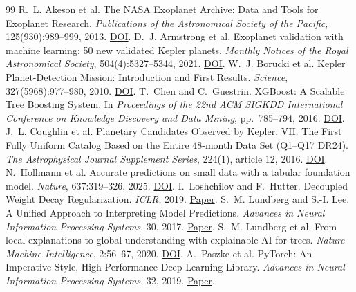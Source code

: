 \documentclass[11pt,a4paper]{article}
\begin{document}
\begin{thebibliography}{99}\small
{} R.~L. Akeson et al. The NASA Exoplanet Archive: Data and Tools for Exoplanet Research. \emph{Publications of the Astronomical Society of the Pacific}, 125(930):989--999, 2013. \href{https://doi.org/10.1086/672273}{DOI}.
 D.~J. Armstrong et al. Exoplanet validation with machine learning: 50 new validated Kepler planets. \emph{Monthly Notices of the Royal Astronomical Society}, 504(4):5327--5344, 2021. \href{https://doi.org/10.1093/mnras/staa2498}{DOI}.
 W.~J. Borucki et al. Kepler Planet-Detection Mission: Introduction and First Results. \emph{Science}, 327(5968):977--980, 2010. \href{https://doi.org/10.1126/science.1185402}{DOI}.
 T.~Chen and C.~Guestrin. XGBoost: A Scalable Tree Boosting System. In \emph{Proceedings of the 22nd ACM SIGKDD International Conference on Knowledge Discovery and Data Mining}, pp.~785--794, 2016. \href{https://doi.org/10.1145/2939672.2939785}{DOI}.
 J.~L. Coughlin et al. Planetary Candidates Observed by Kepler. VII. The First Fully Uniform Catalog Based on the Entire 48-month Data Set (Q1--Q17 DR24). \emph{The Astrophysical Journal Supplement Series}, 224(1), article 12, 2016. \href{https://doi.org/10.3847/0067-0049/224/1/12}{DOI}.
 N.~Hollmann et al. Accurate predictions on small data with a tabular foundation model. \emph{Nature}, 637:319--326, 2025. \href{https://doi.org/10.1038/s41586-024-08328-6}{DOI}.
 I.~Loshchilov and F.~Hutter. Decoupled Weight Decay Regularization. \emph{ICLR}, 2019. \href{https://openreview.net/pdf?id=Bkg6RiCqY7}{Paper}.
 S.~M. Lundberg and S.-I. Lee. A Unified Approach to Interpreting Model Predictions. \emph{Advances in Neural Information Processing Systems}, 30, 2017. \href{https://proceedings.neurips.cc/paper_files/paper/2017/hash/8a20a8621978632d76c43dfd28b67767-Abstract.html}{Paper}.
 S.~M. Lundberg et al. From local explanations to global understanding with explainable AI for trees. \emph{Nature Machine Intelligence}, 2:56--67, 2020. \href{https://doi.org/10.1038/s42256-019-0138-9}{DOI}.
 A.~Paszke et al. PyTorch: An Imperative Style, High-Performance Deep Learning Library. \emph{Advances in Neural Information Processing Systems}, 32, 2019. \href{https://proceedings.neurips.cc/paper_files/paper/2019/hash/bdbca288fee7f92f2bfa9f7012727740-Abstract.html}{Paper}.

\end{thebibliography}
\end{document}

